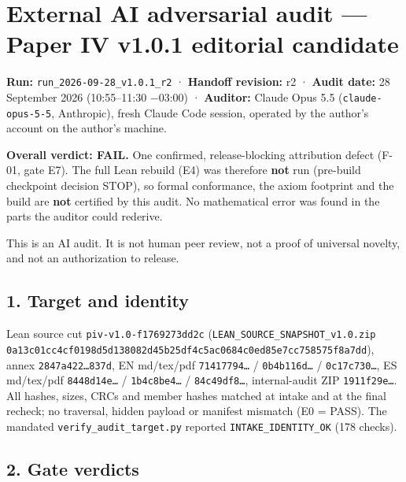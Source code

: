 \documentclass[10pt,a4paper]{article}
\begin{document}
\section*{External AI adversarial audit — Paper IV v1.0.1 editorial candidate}

\textbf{Run:} \texttt{run\_2026-09-28\_v1.0.1\_r2} · \textbf{Handoff revision:} r2 · \textbf{Audit date:} 28 September 2026
(10:55–11:30 −03:00) · \textbf{Auditor:} Claude Opus 5.5 (\texttt{claude-opus-5-5}, Anthropic), fresh Claude Code session,
operated by the author's account on the author's machine.

\textbf{Overall verdict: FAIL.} One confirmed, release-blocking attribution defect (F-01, gate E7). The full Lean
rebuild (E4) was therefore \textbf{not} run (pre-build checkpoint decision STOP), so formal conformance, the axiom
footprint and the build are \textbf{not} certified by this audit. No mathematical error was found in the parts the
auditor could rederive.

This is an AI audit. It is not human peer review, not a proof of universal novelty, and not an authorization to
release.

\subsection*{1. Target and identity}

Lean source cut \texttt{piv-v1.0-f1769273dd2c} (\texttt{LEAN\_SOURCE\_SNAPSHOT\_v1.0.zip}
\texttt{0a13c01cc4cf0198d5d138082d45b25df4c5ac0684c0ed85e7cc758575f8a7dd}), annex \texttt{2847a422…837d}, EN md/tex/pdf
\texttt{71417794…} / \texttt{0b4b116d…} / \texttt{0c17c730…}, ES md/tex/pdf \texttt{8448d14e…} / \texttt{1b4c8be4…} / \texttt{84c49df8…}, internal-audit
ZIP \texttt{1911f29e…}. All hashes, sizes, CRCs and member hashes matched at intake and at the final recheck; no
traversal, hidden payload or manifest mismatch (E0 = PASS). The mandated \texttt{verify\_audit\_target.py} reported
\texttt{INTAKE\_IDENTITY\_OK} (178 checks).

\subsection*{2. Gate verdicts}
\end{document}
